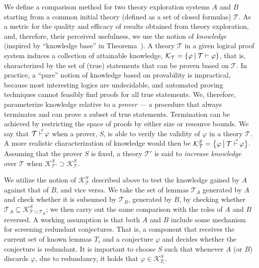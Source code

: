 We define a comparison method for two theory exploration systems $A$ and $B$ starting from a common initial theory (defined as a set of closed formulas) $\mathcal{T}$.
As a metric for the quality and efficacy of results obtained from theory exploration, and, therefore, their perceived usefulness, we use the notion of \emph{knowledge} (inspired by ``knowledge base'' in Theorema~\cite{Journal2002:Buchberger}).
A theory $\mathcal{T}$ in a given logical proof system induces a collection of attainable knowledge, $\mathcal{K}_\mathcal{T} = \left\{\varphi ~\rule[-2.5pt]{0.5pt}{9.5pt}~ \mathcal{T}\vdash\varphi\right\}$,
that is, characterized by the set of (true) statements that can be proven based on $\mathcal{T}$.
In practice, a ``pure'' notion of knowledge based on provability is impractical, because most interesting logics are undecidable,
and automated proving techniques cannot feasibly find proofs for all true statements.
We, therefore, parameterize knowledge relative to a \emph{prover} --- a procedure that always terminates and can prove a subset of true statements.
Termination can be achieved by restricting the space of proofs by either size or resource bounds.
We say that $\mathcal{T}
\vdash^{^{\hspace{-.4em}S\hspace{-.2em}}} \varphi$ when a prover, $S$, is able to verify the validity of $\varphi$ in a theory $\mathcal{T}$.
A more realistic characterization of knowledge would then be
$\mathcal{K}_\mathcal{T}^S = \big\{\varphi ~{\rule[-3pt]{0.5pt}{11.5pt}}~
\mathcal{T}\prvbySinline\varphi\big\}$.
Assuming that the prover $S$ is fixed, a theory $\mathcal{T}'$ is said to \emph{increase knowledge} over $\mathcal{T}$ when
$\mathcal{K}_{\mathcal{T}'}^S \supset \mathcal{K}_{\mathcal{T}}^S$.

We utilize the notion of $\mathcal{K}_\mathcal{T}^S$ described above to test the knowledge gained by $A$ against that of $B$, and vice versa.
We take the set of lemmas $\mathcal{T}_A$ generated by $A$ and check whether it is subsumed by $\mathcal{T}_B$, generated by $B$, by checking whether $\mathcal{T}_A\subseteq \mathcal{K}_{\mathcal{T}\cup\mathcal{T}_B}^S$;
we then carry out the same comparison with the roles of $A$ and $B$ reversed.
A working assumption is that both $A$ and $B$ include some mechanism for screening redundant conjectures.
That is, a component that receives the current set of known lemmas $T_i$ and a conjecture $\varphi$ and decides whether the conjecture is redundant.
It is important to choose $S$ such that whenever $A$ (or $B$) discards $\varphi$, due to redundancy, it holds that $\varphi \in \mathcal{K}_{T_i}^S$.

